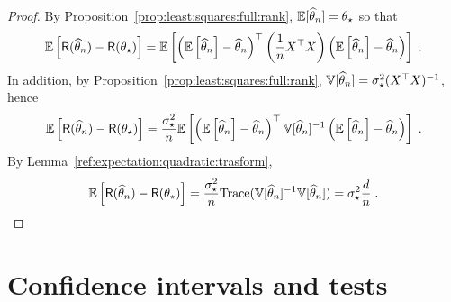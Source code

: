 \begin{proof}
By Proposition~\ref{prop:least:squares:full:rank}, $\mathbb{E}[\widehat {\theta}_n] = \theta_\star$ so that 
$$
\mathbb{E}\left[\mathsf{R}(\widehat {\theta}_n) - \mathsf{R}(\theta_\star)\right] = \mathbb{E}\left[ \left(\mathbb{E}\left[\widehat {\theta}_n\right] - \widehat {\theta}_n\right)^\top \left(\frac{1}{n}X^\top X\right) \left(\mathbb{E}\left[\widehat {\theta}_n\right] - \widehat {\theta}_n\right)\right]\;.
$$
In addition, by Proposition~\ref{prop:least:squares:full:rank}, $\mathbb{V}[\widehat {\theta}_n] = \sigma_\star^2(X^\top X)^{-1}$, hence
$$
\mathbb{E}\left[\mathsf{R}(\widehat {\theta}_n) - \mathsf{R}(\theta_\star)\right] = \frac{\sigma_\star^2}{n}\mathbb{E}\left[ \left(\mathbb{E}\left[\widehat {\theta}_n\right] - \widehat {\theta}_n\right)^\top \mathbb{V}[\widehat {\theta}_n]^{-1} \left(\mathbb{E}\left[\widehat {\theta}_n\right] - \widehat {\theta}_n\right)\right]\;.
$$
By Lemma~\ref{ref:expectation:quadratic:trasform},
$$
\mathbb{E}\left[\mathsf{R}(\widehat {\theta}_n) - \mathsf{R}(\theta_\star)\right] = \frac{\sigma_\star^2}{n}\mathrm{Trace}(\mathbb{V}[\widehat {\theta}_n]^{-1}\mathbb{V}[\widehat {\theta}_n]) = \sigma_\star^2 \frac{d}{n}\;.
$$
\end{proof}

\section{Confidence intervals and tests}

